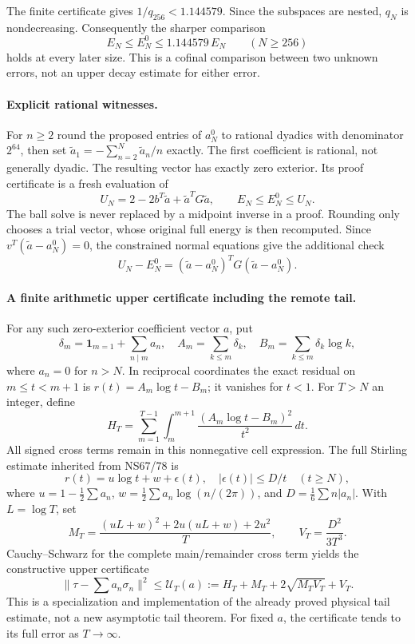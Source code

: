 The finite certificate gives $1/q_{256}<1.144579$. Since the subspaces
are nested, $q_N$ is nondecreasing. Consequently the sharper comparison
\[
 E_N\le E_N^0\le1.144579\,E_N\qquad(N\ge256)
\]
holds at every later size. This is a cofinal comparison between two unknown
errors, not an upper decay estimate for either error.

\paragraph{Explicit rational witnesses.}
For $n\ge2$ round the proposed entries of $a_N^0$ to rational dyadics with
denominator $2^{64}$, then set
$\widetilde a_1=-\sum_{n=2}^N\widetilde a_n/n$ exactly. The first coefficient
is rational, not generally dyadic. The resulting vector has exactly zero
exterior. Its proof certificate is a fresh evaluation of
\[
 U_N=2-2b^T\widetilde a+\widetilde a^TG\widetilde a,
 \qquad E_N\le E_N^0\le U_N.
\]
The ball solve is never replaced by a midpoint inverse in a proof.
Rounding only chooses a trial vector, whose original full energy is then
recomputed. Since $v^T(\widetilde a-a_N^0)=0$, the constrained normal
equations give the additional check
\[
 U_N-E_N^0=(\widetilde a-a_N^0)^TG(\widetilde a-a_N^0).
\]

\paragraph{A finite arithmetic upper certificate including the remote tail.}
For any such zero-exterior coefficient vector $a$, put
\[
 \delta_m=\mathbf1_{m=1}+\sum_{n\mid m}a_n,\quad
 A_m=\sum_{k\le m}\delta_k,\quad
 B_m=\sum_{k\le m}\delta_k\log k,
\]
where $a_n=0$ for $n>N$. In reciprocal coordinates the exact residual on
$m\le t<m+1$ is $r(t)=A_m\log t-B_m$; it vanishes for $t<1$.
For $T>N$ an integer, define
\[
 H_T=\sum_{m=1}^{T-1}\int_m^{m+1}
          \frac{(A_m\log t-B_m)^2}{t^2}\,dt.
\]
All signed cross terms remain in this nonnegative cell expression.
The full Stirling estimate inherited from NS67/78 is
\[
 r(t)=u\log t+w+\epsilon(t),\quad |\epsilon(t)|\le D/t\quad(t\ge N),
\]
where $u=1-\tfrac12\sum a_n$,
$w=\tfrac12\sum a_n\log(n/(2\pi))$, and
$D=\tfrac16\sum n|a_n|$. With $L=\log T$, set
\[
 M_T=\frac{(uL+w)^2+2u(uL+w)+2u^2}{T},\qquad
 V_T=\frac{D^2}{3T^3}.
\]
Cauchy--Schwarz for the complete main/remainder cross term yields the
constructive upper certificate
\begin{equation}
 \|\tau-\sum a_n\sigma_n\|^2
 \le \mathcal U_T(a):=H_T+M_T+2\sqrt{M_TV_T}+V_T.
 \label{eq:ns89-physical-upper}
\end{equation}
This is a specialization and implementation of the already proved physical
tail estimate, not a new asymptotic tail theorem. For fixed $a$, the
certificate tends to its full error as $T\to\infty$.

